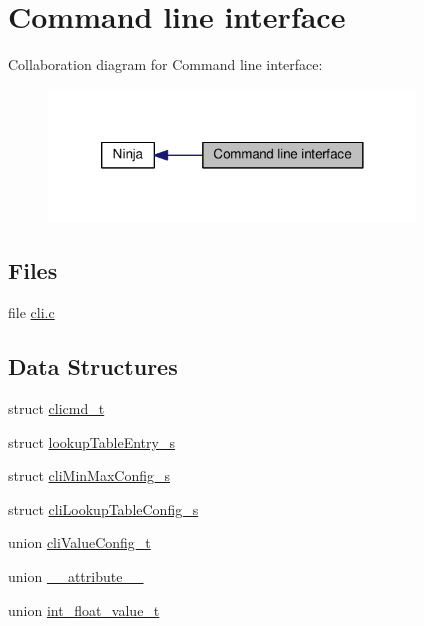 \hypertarget{group__cli}{\section{Command line interface}
\label{group__cli}
}
Collaboration diagram for Command line interface\+:\nopagebreak
\begin{figure}[H]
\begin{center}
\leavevmode
\includegraphics[width=276pt]{group__cli}
\end{center}
\end{figure}
\subsection*{Files}
\begin{DoxyCompactItemize}
\item 
file \hyperlink{cli_8c}{cli.\+c}
\end{DoxyCompactItemize}
\subsection*{Data Structures}
\begin{DoxyCompactItemize}
\item 
struct \hyperlink{structclicmd__t}{clicmd\+\_\+t}
\item 
struct \hyperlink{structlookupTableEntry__s}{lookup\+Table\+Entry\+\_\+s}
\item 
struct \hyperlink{structcliMinMaxConfig__s}{cli\+Min\+Max\+Config\+\_\+s}
\item 
struct \hyperlink{structcliLookupTableConfig__s}{cli\+Lookup\+Table\+Config\+\_\+s}
\item 
union \hyperlink{unioncliValueConfig__t}{cli\+Value\+Config\+\_\+t}
\item 
union \hyperlink{struct____attribute____}{\+\_\+\+\_\+attribute\+\_\+\+\_\+}
\item 
union \hyperlink{unionint__float__value__t}{int\+\_\+float\+\_\+value\+\_\+t}
\end{DoxyCompactItemize}
